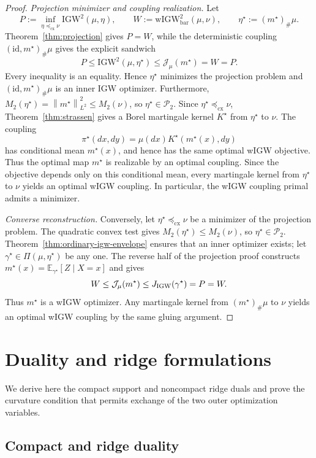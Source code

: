 \documentclass[11pt]{article}
\newcommand{\E}{\mathbb E}
\newcommand{\cP}{\mathcal P}
\newcommand{\norm}[1]{\left\lVert #1\right\rVert}
\newcommand{\cx}{\preceq_{\mathrm{cx}}}
\newcommand{\wIGW}{\mathrm{wIGW}_{\mathrm{bar}}}
\newcommand{\IGW}{\mathrm{IGW}}
\theoremstyle{plain}
\theoremstyle{definition}
\theoremstyle{remark}
\begin{document}
\begin{proof}
\emph{Projection minimizer and coupling realization.}
Let
\[
 P:=\inf_{\eta\cx\nu}\IGW^2(\mu,\eta),\qquad
 W:=\wIGW^2(\mu,\nu),\qquad
 \eta^\star:=(m^\star)_\#\mu.
\]
Theorem~\ref{thm:projection} gives $P=W$, while the deterministic coupling
$(\mathrm{id},m^\star)_\#\mu$ gives the explicit sandwich
\[
 P\le\IGW^2(\mu,\eta^\star)
 \le \mathcal J_\mu(m^\star)=W=P.
\]
Every inequality is an equality.  Hence $\eta^\star$ minimizes the projection
problem and $(\mathrm{id},m^\star)_\#\mu$ is an inner IGW optimizer.
Furthermore,
$M_2(\eta^\star)=\norm{m^\star}_{L^2}^2\le M_2(\nu)$, so
$\eta^\star\in\cP_2$.  Since $\eta^\star\cx\nu$,
Theorem~\ref{thm:strassen} gives a Borel
martingale kernel $K^\star$ from $\eta^\star$ to $\nu$.  The coupling
\[
 \pi^\star(dx,dy)=\mu(dx)K^\star(m^\star(x),dy)
\]
has conditional mean $m^\star(x)$, and hence has the same optimal wIGW objective.
Thus the optimal map $m^\star$ is realizable by an optimal coupling.
Since the objective depends only on this conditional mean, every martingale kernel
from $\eta^\star$ to $\nu$ yields an optimal wIGW coupling.  In particular, the wIGW
coupling primal admits a minimizer.

\emph{Converse reconstruction.}
Conversely, let $\eta^\star\cx\nu$ be a minimizer of the projection problem.  The quadratic
convex test gives $M_2(\eta^\star)\le M_2(\nu)$, so
$\eta^\star\in\cP_2$.  Theorem~\ref{thm:ordinary-igw-envelope} ensures that an
inner optimizer exists; let $\gamma^\star\in\Pi(\mu,\eta^\star)$ be any one.
The reverse half of the projection proof constructs
$m^\star(x)=\E_{\gamma^\star}[Z\mid X=x]$ and gives
\[
 W\le \mathcal J_\mu(m^\star)
 \le J_{\rm IGW}(\gamma^\star)=P=W.
\]
Thus $m^\star$ is a wIGW optimizer.  Any martingale kernel from
$(m^\star)_\#\mu$ to $\nu$ yields an optimal wIGW coupling by the same gluing
argument.
\end{proof}

\section{Duality and ridge formulations}
\label{app:duality-proofs}

We derive here the compact support and noncompact ridge duals and prove the curvature
condition that permits exchange of the two outer optimization variables.

\subsection{Compact and ridge duality}
\end{document}
